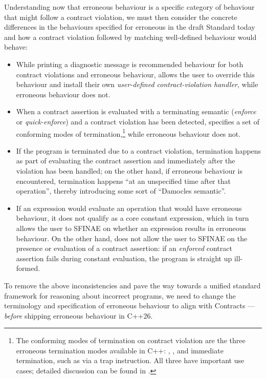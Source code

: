 Understanding now that erroneous behaviour is a specific category of behaviour that might follow a contract violation, we must then consider the concrete differences in the behaviours specified for erroneous in the draft Standard today and how a contract violation followed by matching well-defined behaviour would behave:
\begin{itemize}
\item While printing a diagnostic message is recommended behaviour for both contract violations and erroneous behaviour, \cite{P2900R13} allows the user to override this behaviour and install their own \emph{user-defined contract-violation handler}, while erroneous behaviour does not.

\item When a contract assertion is evaluated with a terminating semantic (\emph{enforce} or \emph{quick-enforce}) and a contract violation has been detected, \cite{P2900R13} specifies a set of conforming modes of termination,\footnote{The conforming modes of termination on contract violation are the three erroneous termination modes available in C++: , , and immediate termination, such as via a trap instruction. All three have important use cases; detailed discussion can be found in \cite{P3520R0}.} while erroneous behaviour does not.

\item If the program is terminated due to a contract violation, termination happens as part of evaluating the contract assertion and immediately after the violation has been handled; on the other hand, if erroneous behaviour is encountered, termination happens ``at an unspecified time after that operation'', thereby introducing some sort of ``Damocles semantic''. 

\item If an expression would evaluate an operation that would have erroneous behaviour, it does not qualify as a core constant expression, which in turn allows the user to SFINAE on whether an expression results in erroneous behaviour. On the other hand, \cite{P2900R13} does not allow the user to SFINAE on the presence or evaluation of a contract assertion: if an \emph{enforced} contract assertion fails during constant evaluation, the program is straight up ill-formed. 
\end{itemize}

To remove the above inconsistencies and pave the way towards a unified standard framework for reasoning about incorrect programs, we need to change the terminology and specification of erroneous behaviour to align with Contracts --- \emph{before} shipping erroneous behaviour in C++26.

